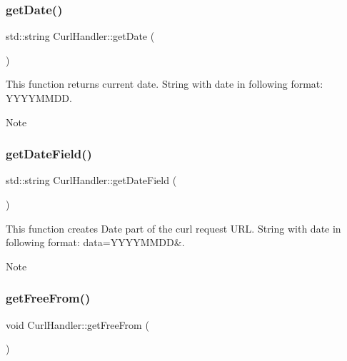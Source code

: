 \subsubsection{\texorpdfstring{get\+Date()}{getDate()}}
{\footnotesize\ttfamily std\+::string Curl\+Handler\+::get\+Date (\begin{DoxyParamCaption}{ }\end{DoxyParamCaption})}



This function returns current date.  String with date in following format\+: Y\+Y\+Y\+Y\+M\+M\+DD. 

\begin{DoxyNote}{Note}

\end{DoxyNote}
\mbox{\label{classCurlHandler_a021967e447f8980a4629b85cc3683a93}} 
\subsubsection{\texorpdfstring{get\+Date\+Field()}{getDateField()}}
{\footnotesize\ttfamily std\+::string Curl\+Handler\+::get\+Date\+Field (\begin{DoxyParamCaption}{ }\end{DoxyParamCaption})}



This function creates Date part of the curl request U\+RL.  String with date in following format\+: data=Y\+Y\+Y\+Y\+M\+M\+DD\&. 

\begin{DoxyNote}{Note}

\end{DoxyNote}
\mbox{\label{classCurlHandler_a43b8d7b4ec2866c34820baa71236a15a}} 
\subsubsection{\texorpdfstring{get\+Free\+From()}{getFreeFrom()}}
{\footnotesize\ttfamily void Curl\+Handler\+::get\+Free\+From (\begin{DoxyParamCaption}{ }\end{DoxyParamCaption})}



